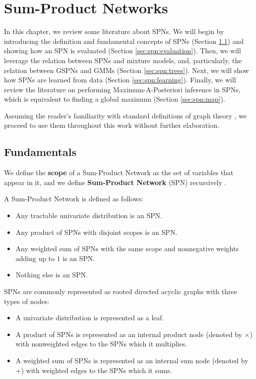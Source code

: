 \chapter{Sum-Product Networks}
\label{cap:spn}

In this chapter, we review some literature about SPNs. We will begin by introducing the definition and fundamental concepts of SPNs (Section \ref{sec:spn:fundamentals}) and showing how an SPN is evaluated (Section \ref{sec:spn:evaluation}). Then, we will leverage the relation between SPNs and mixture models, and, particularly, the relation between GSPNs and GMMs (Section \ref{sec:spn:trees}). Next, we will show how SPNs are learned from data (Section \ref{sec:spn:learning}). Finally, we will review the literature on performing Maximum-A-Posteriori inference in SPNs, which is equivalent to finding a global maximum (Section \ref{sec:spn:map}).

Assuming the reader's familiarity with standard definitions of graph theory \citep{Bondy2008}, we proceed to use them throughout this work without further elaboration.

\section{Fundamentals}
\label{sec:spn:fundamentals}

We define the \textbf{scope} of a Sum-Product Network as the set of variables that appear in it, and we define \textbf{Sum-Product Network} (SPN) recursively \citep{Gens2013}.

\begin{definition}
  A Sum-Product Network is defined as follows:

  \begin{itemize}
    \item Any tractable univariate distribution is an SPN.
    \item Any product of SPNs with disjoint scopes is an SPN.
    \item Any weighted sum of SPNs with the same scope and nonnegative weights adding up to $1$ is an SPN.
    \item Nothing else is an SPN.
  \end{itemize}
\end{definition}

SPNs are commonly represented as rooted directed acyclic graphs with three types of nodes:

\begin{itemize}
  \item A univariate distribution is represented as a leaf.
  \item A product of SPNs is represented as an internal product node (denoted by $\times$) with nonweighted edges to the SPNs which it multiplies.
  \item A weighted sum of SPNs is represented as an internal sum node (denoted by $+$) with weighted edges to the SPNs which it sums.
\end{itemize}

